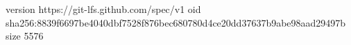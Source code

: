 version https://git-lfs.github.com/spec/v1
oid sha256:8839f6697be4040dbf7528f876bec680780d4ce20dd37637b9abe98aad29497b
size 5576
